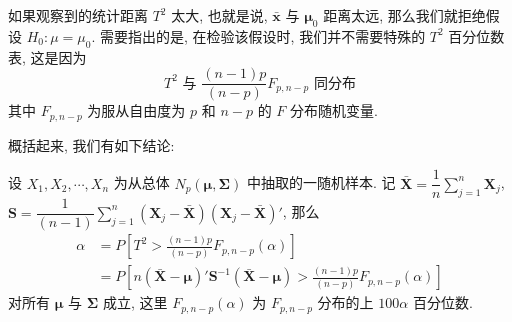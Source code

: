 如果观察到的统计距离 $T^2$ 太大, 也就是说, $\bar{\mathbf{x}}$ 与 $\boldsymbol{\mu}_0$ 距离太远, 那么我们就拒绝假设 $H_0: \mu = \mu_0$. 需要指出的是, 在检验该假设时, 我们并不需要特殊的 $T^2$ 百分位数表, 这是因为
\label{eq:5-5}
\begin{equation}
T^2 \text{ 与 } \frac{(n-1)p}{(n-p)}F_{p, n-p} \text{ 同分布} \tag{5-5}
\end{equation}
其中 $F_{p, n-p}$ 为服从自由度为 $p$ 和 $n-p$ 的 $F$ 分布随机变量.

概括起来, 我们有如下结论:

\begin{mvbox}
设 $X_1, X_2, \cdots, X_n$ 为从总体 $N_p(\boldsymbol{\mu}, \boldsymbol{\Sigma})$ 中抽取的一随机样本. 记 $\bar{\mathbf{X}} = \dfrac{1}{n}\sum\limits_{j=1}^{n}\mathbf{X}_j$, $\mathbf{S} = \dfrac{1}{(n-1)}\sum\limits_{j=1}^{n}(\mathbf{X}_j - \bar{\mathbf{X}})(\mathbf{X}_j - \bar{\mathbf{X}})'$, 那么
\label{eq:5-6}
\begin{align}
\alpha &= P\left[T^2 > \frac{(n-1)p}{(n-p)}F_{p, n-p}(\alpha)\right] \nonumber \\
&= P\left[n(\bar{\mathbf{X}} - \boldsymbol{\mu})'\mathbf{S}^{-1}(\bar{\mathbf{X}} - \boldsymbol{\mu}) > \frac{(n-1)p}{(n-p)}F_{p, n-p}(\alpha)\right] \tag{5-6}
\end{align}
对所有 $\boldsymbol{\mu}$ 与 $\boldsymbol{\Sigma}$ 成立, 这里 $F_{p, n-p}(\alpha)$ 为 $F_{p, n-p}$ 分布的上 $100\alpha$ 百分位数.
\end{mvbox}
